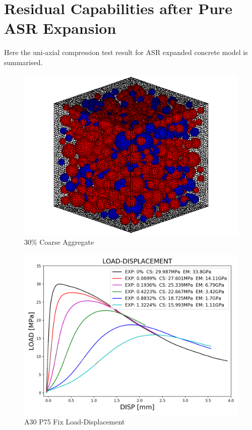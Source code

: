 \clearpage

\section{Residual Capabilities after Pure ASR Expansion}

Here the uni-axial compression test result for ASR expanded concrete model is summarised.

\begin{figure}[ht]
\centering
\includegraphics[width=.3\linewidth]{Files/Aggregate/A30P75.png}
  \caption{30\% Coarse Aggregate}
  \label{fig:A30P75_model}
\end{figure}



\begin{figure}[ht]
\centering
\includegraphics[width=.8\linewidth]{Files/exp_3D/ASR/S13A30P75FIX-LOAD-DISPLACEMENT.png}
  \caption{A30 P75 Fix Load-Displacement}
  \label{fig:A30P75FIX_LD}
\end{figure}





